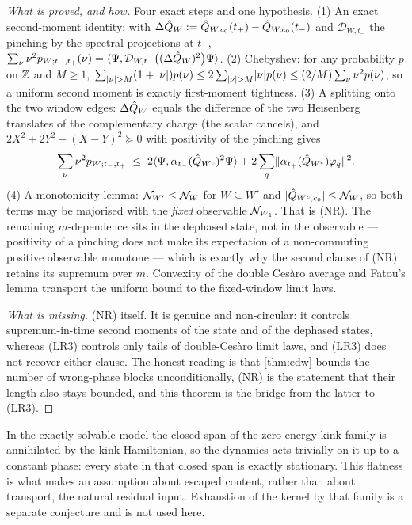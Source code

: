 \begin{proof}[What is proved, and how]
Four exact steps and one hypothesis. (1) An exact second-moment identity: with
$\Delta\hat{Q}_W:=\hat{Q}_{W,c_0}(t_+)-\hat{Q}_{W,c_0}(t_-)$ and
$\mathcal{D}_{W,t_-}$ the pinching by the spectral projections at $t_-$,
$\sum_\nu\nu^2p_{W;t_-,t_+}(\nu)
=\langle \Psi,\mathcal{D}_{W,t_-}\bigl((\Delta\hat{Q}_W)^2\bigr)\Psi\rangle$.
(2) Chebyshev: for any probability $p$ on $\mathbb{Z}$ and $M\ge1$,
$\sum_{\lvert \nu\rvert>M}(1+\lvert \nu\rvert)p(\nu)\le
2\sum_{\lvert \nu\rvert>M}\lvert \nu\rvert p(\nu)\le(2/M)\sum_\nu\nu^2p(\nu)$, so a uniform
second moment is exactly first-moment tightness.
(3) A splitting onto the two window edges: $\Delta\hat{Q}_W$ equals the
difference of the two Heisenberg translates of the complementary charge (the
scalar cancels), and $2X^2+2Y^2-(X-Y)^2\succeq0$ with positivity of the
pinching gives
\begin{equation}
  \sum_\nu\nu^2p_{W;t_-,t_+}
  \;\le\;2\langle \Psi,\alpha_{t_-}(\hat{Q}_{W^c})^2\Psi\rangle
  +2\sum_q\lVert \alpha_{t_+}(\hat{Q}_{W^c})\varphi_q\rVert^2 .
  \label{eq:second-moment-split}
\end{equation}
(4) A monotonicity lemma: $\mathcal{N}_{W'}\le\mathcal{N}_W$ for $W\subseteq W'$ and
$\lvert \hat{Q}_{W^c,c_0}\rvert\le\mathcal{N}_W$, so both terms may be majorised with the
\emph{fixed} observable $\mathcal{N}_{W_1}$. That is (NR). The remaining
$m$-dependence sits in the dephased state, not in the observable --- positivity
of a pinching does not make its expectation of a non-commuting positive
observable monotone --- which is exactly why the second clause of (NR) retains
its supremum over $m$. Convexity of the double Ces\`aro average and Fatou's
lemma transport the uniform bound to the fixed-window limit laws.

\emph{What is missing.} (NR) itself. It is genuine and non-circular: it
controls supremum-in-time second moments of the state and of the dephased
states, whereas (LR3) controls only tails of double-Ces\`aro limit laws, and
(LR3) does not recover either clause. The honest reading is that
\cref{thm:edw} bounds the number of wrong-phase blocks unconditionally, (NR)
is the statement that their length also stays bounded, and this theorem is the
bridge from the latter to (LR3).
\end{proof}

\begin{remark}
\label{rem:flatness}
In the exactly solvable model the closed span of the zero-energy kink family is
annihilated by the kink Hamiltonian, so the dynamics acts trivially on it up to
a constant phase: every state in that closed span is exactly stationary. This
flatness is what makes an assumption about escaped content, rather than about
transport, the natural residual input. Exhaustion of the kernel by that family
is a separate conjecture and is not used here.
\end{remark}

